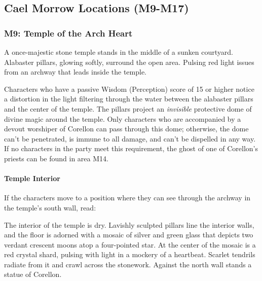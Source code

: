 \documentclass[letterpaper, 11pt, bg=full, twocolumn]{dndbook}
\begin{document}
\subsection{Cael Morrow Locations (M9-M17)}


\subsubsection{M9: Temple of the Arch Heart}

\begin{DndReadAloud}
A once-majestic stone temple stands in the middle of a sunken courtyard. Alabaster pillars, glowing softly, surround the open area. Pulsing red light issues from an archway that leads inside the temple.
\end{DndReadAloud}

Characters who have a passive Wisdom (Perception) score of 15 or higher notice a distortion in the light filtering through the water between the alabaster pillars and the center of the temple. The pillars project an \textit{invisible} protective dome of divine magic around the temple. Only characters who are accompanied by a devout worshiper of Corellon can pass through this dome; otherwise, the dome can't be penetrated, is immune to all damage, and can't be dispelled in any way. If no characters in the party meet this requirement, the ghost of one of Corellon's priests can be found in area M14.

\paragraph{Temple Interior}

If the characters move to a position where they can see through the archway in the temple's south wall, read:

\begin{DndReadAloud}
The interior of the temple is dry. Lavishly sculpted pillars line the interior walls, and the floor is adorned with a mosaic of silver and green glass that depicts two verdant crescent moons atop a four-pointed star. At the center of the mosaic is a red crystal shard, pulsing with light in a mockery of a heartbeat. Scarlet tendrils radiate from it and crawl across the stonework. Against the north wall stands a statue of Corellon.
\end{DndReadAloud}
\end{document}
